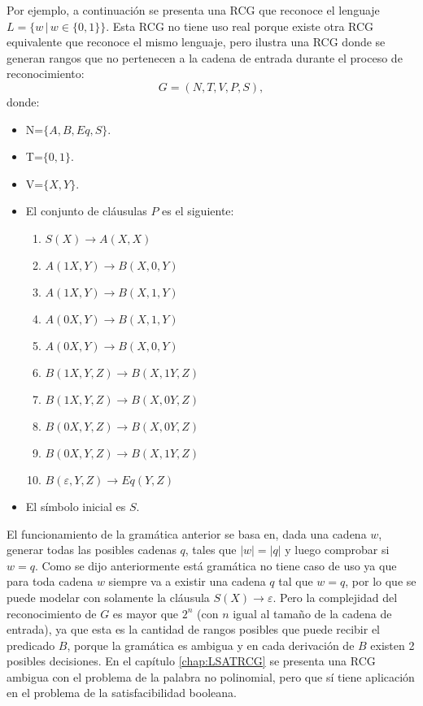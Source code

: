 \documentclass[12pt]{article}
\begin{document}
Por ejemplo, a continuación se presenta una RCG que reconoce el lenguaje $L=\{w\,|\,w\in\{0,1\}\}$. Esta RCG no tiene uso real porque existe otra RCG equivalente que reconoce el
mismo lenguaje, pero ilustra una RCG donde se generan rangos que no pertenecen a la cadena de entrada durante el proceso
de reconocimiento:
\[
    G = (N, T, V, P, S),
\]
donde:

\begin{itemize}
    \item  N=$\{A,B,Eq,S\}$.
    \item T=$\{0,1\}$.
    \item V=$\{X,Y\}$.
    \item El conjunto de cláusulas $P$ es el siguiente:
          \begin{enumerate}
              \item $S(X)\to A(X,X)$
              \item $A(1X,Y)\to B(X,0,Y)$
              \item $A(1X,Y)\to B(X,1,Y)$
              \item $A(0X,Y)\to B(X,1,Y)$
              \item $A(0X,Y)\to B(X,0,Y)$
              \item $B(1X,Y,Z)\to B(X,1Y,Z)$
              \item $B(1X,Y,Z)\to B(X,0Y,Z)$
              \item $B(0X,Y,Z)\to B(X,0Y,Z)$
              \item $B(0X,Y,Z)\to B(X,1Y,Z)$
              \item $B(\varepsilon,Y,Z)\to Eq(Y,Z)$
          \end{enumerate}

    \item El símbolo inicial es $S$.
\end{itemize}

El funcionamiento de la gramática anterior se basa en, dada una cadena $w$, generar todas las posibles
cadenas $q$, tales que $|w|=|q|$ y luego comprobar si $w = q$. Como se dijo anteriormente está gramática
no tiene caso de uso ya que para toda cadena $w$ siempre va a existir una cadena $q$ tal que $w=q$,
por lo que se puede modelar con solamente la cláusula $S(X)\to \varepsilon$. Pero la complejidad del
reconocimiento de $G$ es mayor que $2^n$ (con $n$ igual al tamaño de la cadena de entrada), ya que esta
es la cantidad de rangos posibles que puede recibir el predicado $B$, porque la gramática es ambigua
y en cada derivación de $B$ existen 2 posibles decisiones. En el capítulo \ref{chap:LSATRCG} se presenta una
RCG ambigua con el problema de la palabra no polinomial, pero que sí tiene aplicación en el problema de la
satisfacibilidad booleana.
\end{document}
